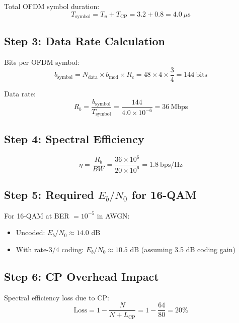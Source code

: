 Total OFDM symbol duration:
\begin{equation}
T_{\mathrm{symbol}} = T_u + T_{\mathrm{CP}} = 3.2 + 0.8 = 4.0\ \mu\text{s}
\end{equation}

\subsection*{Step 3: Data Rate Calculation}

Bits per OFDM symbol:
\begin{equation}
b_{\mathrm{symbol}} = N_{\mathrm{data}} \times b_{\mathrm{mod}} \times R_c = 48 \times 4 \times \frac{3}{4} = 144\ \text{bits}
\end{equation}

Data rate:
\begin{equation}
R_b = \frac{b_{\mathrm{symbol}}}{T_{\mathrm{symbol}}} = \frac{144}{4.0 \times 10^{-6}} = 36\ \text{Mbps}
\end{equation}

\subsection*{Step 4: Spectral Efficiency}

\begin{equation}
\eta = \frac{R_b}{BW} = \frac{36 \times 10^6}{20 \times 10^6} = 1.8\ \text{bps/Hz}
\end{equation}

\subsection*{Step 5: Required $E_b/N_0$ for 16-QAM}

For 16-QAM at BER $= 10^{-5}$ in AWGN:
\begin{itemize}
\item Uncoded: $E_b/N_0 \approx 14.0$ dB
\item With rate-3/4 coding: $E_b/N_0 \approx 10.5$ dB (assuming 3.5 dB coding gain)
\end{itemize}

\subsection*{Step 6: CP Overhead Impact}

Spectral efficiency loss due to CP:
\begin{equation}
\mathrm{Loss} = 1 - \frac{N}{N + L_{\mathrm{CP}}} = 1 - \frac{64}{80} = 20\%
\end{equation}

